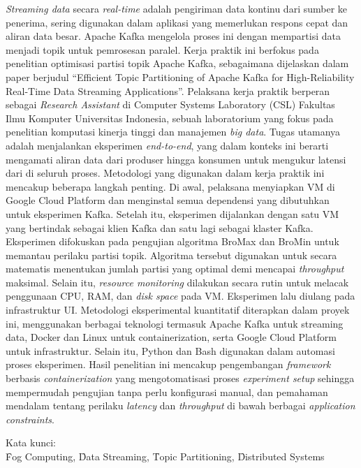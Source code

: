 \noindent \textit{Streaming data} secara \textit{real-time} adalah pengiriman data kontinu dari sumber ke penerima, sering digunakan dalam aplikasi yang memerlukan respons cepat dan aliran data besar. Apache Kafka mengelola proses ini dengan mempartisi data menjadi topik untuk pemrosesan paralel. Kerja praktik ini berfokus pada penelitian optimisasi partisi topik Apache Kafka, sebagaimana dijelaskan dalam paper berjudul ``Efficient Topic Partitioning of Apache Kafka for High-Reliability Real-Time Data Streaming Applications''. Pelaksana kerja praktik berperan sebagai \textit{Research Assistant} di Computer Systems Laboratory (CSL) Fakultas Ilmu Komputer Universitas Indonesia, sebuah laboratorium yang fokus pada penelitian komputasi kinerja tinggi dan manajemen \textit{big data}. Tugas utamanya adalah menjalankan eksperimen \textit{end-to-end}, yang dalam konteks ini berarti mengamati aliran data dari produser hingga konsumen untuk mengukur latensi dari di seluruh proses. Metodologi yang digunakan dalam kerja praktik ini mencakup beberapa langkah penting. Di awal, pelaksana menyiapkan VM di Google Cloud Platform dan menginstal semua dependensi yang dibutuhkan untuk eksperimen Kafka. Setelah itu, eksperimen dijalankan dengan satu VM yang bertindak sebagai klien Kafka dan satu lagi sebagai klaster Kafka. Eksperimen difokuskan pada pengujian algoritma BroMax dan BroMin untuk memantau perilaku partisi topik. Algoritma tersebut digunakan untuk secara matematis menentukan jumlah partisi yang optimal demi mencapai \textit{throughput} maksimal. Selain itu, \textit{resource monitoring} dilakukan secara rutin untuk melacak penggunaan CPU, RAM, dan \textit{disk space} pada VM. Eksperimen lalu diulang pada infrastruktur UI. Metodologi eksperimental kuantitatif diterapkan dalam proyek ini, menggunakan berbagai teknologi termasuk Apache Kafka untuk streaming data, Docker dan Linux untuk containerization, serta Google Cloud Platform untuk infrastruktur. Selain itu, Python dan Bash digunakan dalam automasi proses eksperimen. Hasil penelitian ini mencakup pengembangan \textit{framework} berbasis \textit{containerization} yang mengotomatisasi proses \textit{experiment setup} sehingga mempermudah pengujian tanpa perlu konfigurasi manual, dan pemahaman mendalam tentang perilaku \textit{latency} dan \textit{throughput} di bawah berbagai \textit{application constraints}. \\

\vspace*{0.2cm}

\noindent Kata kunci: \\ \f{Fog Computing}, \f{Data Streaming}, \f{Topic Partitioning}, \f{Distributed Systems} \\

\newpage
